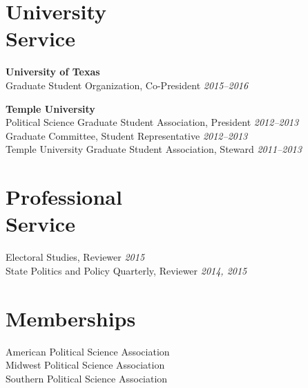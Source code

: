 \documentclass[margin,line]{res}
\begin{document}
\begin{resume}
\section{\sc University \\Service}
\textbf{University of Texas} \\
Graduate Student Organization, Co-President \hfill \emph{2015--2016} %

\textbf{Temple University}\\
Political Science Graduate Student Association, President \hfill \emph{2012--2013} \\
Graduate Committee, Student Representative \hfill \emph{2012--2013} \\
Temple University Graduate Student Association, Steward \hfill \emph{2011--2013} %

\section{\sc Professional \\Service}
Electoral Studies, Reviewer \hfill \emph{2015}\\
State Politics and Policy Quarterly, Reviewer \hfill \emph{2014, 2015} \\

\section{\sc Memberships}
American Political Science Association \\
Midwest Political Science Association \\
Southern Political Science Association \\


\end{resume}
\end{document}
